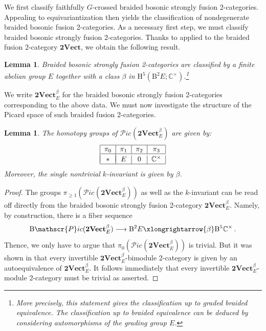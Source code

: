 \documentclass[11pt,reqno]{amsart}
\newcommand{\tVect}{\mathbf{2Vect}}
\newcommand{\sPic}{\mathscr{P}ic}
\newcommand{\rH}{\mathrm{H}}
\newcommand{\rB}{\mathrm{B}}
\numberwithin{equation}{section}
\theoremstyle{plain}
\newtheorem{lem}[equation]{Lemma}
\theoremstyle{definition}
\begin{document}
We first classify faithfully $G$-crossed braided bosonic strongly fusion 2-categories. Appealing to equivariantization then yields the classification of nondegenerate braided bosonic fusion 2-categories. As a necessary first step, we must classify braided bosonic strongly fusion 2-categories. Thanks to  applied to the braided fusion 2-category $\mathbf{2Vect}$, we obtain the following result.

\begin{lem}
Braided bosonic strongly fusion 2-categories are classified by a finite abelian group $E$ together with a class $\beta$ in $\rH^5(\rB^2 E;\mathbb C^\times)$.\footnote{More precisely, this statement gives the classification up to graded braided equivalence. The classification up to braided equivalence can be deduced by considering automorphisms of the grading group $E$.}
\end{lem}

We write $\tVect^\beta_{E}$ for the braided bosonic strongly fusion 2-categories corresponding to the above data. We must now investigate the structure of the Picard space of such braided fusion 2-categories.

\begin{lem}\label{lem:bosonicpic}
    The homotopy groups of $\sPic^{}(\tVect^\beta_{E})$ are given by:
\begin{equation}\label{eq:pic2Vec}
\begin{tabular}{|c|c|c|c|c|}
\hline
$\pi_0$ & $\pi_1$ & $\pi_2$ & $\pi_3$\\
\hline \\[-1em]
$*$ & $E$ &  $0$ &  $\mathbb{C}^{\times}$\\
\hline
\end{tabular}
\end{equation}
Moreover, the single nontrivial $k$-invariant is given by $\beta$.
\end{lem}
\begin{proof}
The groups $\pi_{\geq 1}(\sPic^{}(\tVect^\beta_{E}))$ as well as the $k$-invariant can be read off directly from the braided bosonic strongly fusion 2-category $\tVect^\beta_{{E}}$. Namely, by construction,
there is a fiber sequence 
\begin{equation}
    \rB \sPic(\tVect^\beta_{E}) \longrightarrow \rB^2 E \xlongrightarrow{\beta} \rB^5\mathbb C^\times\,.
\end{equation}
Thence, we only have to argue that $\pi_{0}(\sPic^{}(\tVect^\beta_{ E}))$ is trivial. But it was shown in \cite[Proposition 3.4.1]{Decoppet:2023bay} that every invertible $\tVect^\beta_{ E}$-bimodule 2-category is given by an autoequivalence of $\tVect^\beta_{ E}$. It follows immediately that every invertible $\tVect^\beta_{ E}$-module 2-category must be trivial as asserted.
\end{proof}
\end{document}
